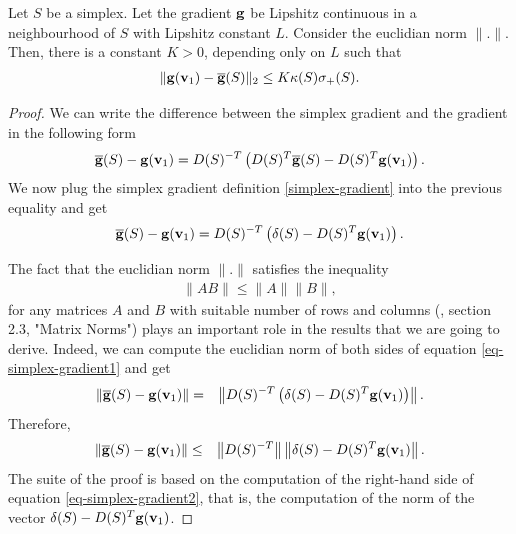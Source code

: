 \begin{proposition}
\label{proposition-simplex-simplexgradient}
Let $S$ be a simplex. Let the gradient $\mathbf{g}$ be Lipshitz continuous in a neighbourhood
of $S$ with Lipshitz constant $L$. Consider the euclidian norm $\|.\|$. Then, there is a constant $K>0$,
depending only on $L$ such that 
\begin{eqnarray}
\label{eq-inequality-simplexgradient}
\| \mathbf{g}(\mathbf{v}_1) - \overline{\mathbf{g}}(S) \|_2 \leq K \kappa(S) \sigma_+(S).
\end{eqnarray}
\end{proposition}

\begin{proof}
We can write the difference between the simplex 
gradient and the gradient in the following form
\begin{eqnarray}
\overline{\mathbf{g}}(S) - \mathbf{g}(\mathbf{v}_1) = D(S)^{-T} \left( D(S)^T \overline{\mathbf{g}}(S) - D(S)^T \mathbf{g}(\mathbf{v}_1) \right).
\end{eqnarray}
We now plug the simplex gradient definition \ref{simplex-gradient} 
into the previous equality and get
\begin{eqnarray}
\label{eq-simplex-gradient1}
\overline{\mathbf{g}}(S) - \mathbf{g}(\mathbf{v}_1) = D(S)^{-T} \left( \delta(S) - D(S)^T \mathbf{g}(\mathbf{v}_1) \right).
\end{eqnarray}

The fact that the euclidian norm $\|.\|$ satisfies the 
inequality 
\begin{eqnarray}
\| A B \| \leq \|A\|\|B\|,
\end{eqnarray}
for any matrices $A$ and $B$ with suitable number of rows 
and columns (\cite{citeulike:2122238}, section 2.3, "Matrix Norms") 
plays an important role in the results that we are going to derive.
Indeed, we can compute the euclidian norm of both sides 
of equation \ref{eq-simplex-gradient1} and get
\begin{eqnarray}
\left\| \overline{\mathbf{g}}(S) - \mathbf{g}(\mathbf{v}_1) \right\| 
&=& \left\| D(S)^{-T} \left( \delta(S) - D(S)^T \mathbf{g}(\mathbf{v}_1) \right) \right\|.
\end{eqnarray}
Therefore, 
\begin{eqnarray}
\label{eq-simplex-gradient2}
\left\| \overline{\mathbf{g}}(S) - \mathbf{g}(\mathbf{v}_1) \right\| 
&\leq& \left\| D(S)^{-T} \right\| \left\| \delta(S) - D(S)^T \mathbf{g}(\mathbf{v}_1) \right\|.
\end{eqnarray}
The suite of the proof is based on the computation of the right-hand side 
of equation \ref{eq-simplex-gradient2}, that is, the computation of the norm
of the vector $\delta(S) - D(S)^T \mathbf{g}(\mathbf{v}_1)$.


\end{proof}
